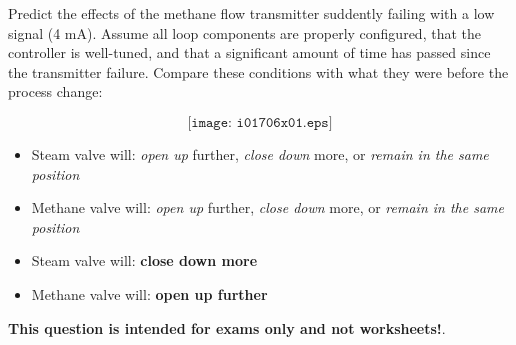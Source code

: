 

Predict the effects of the methane flow transmitter suddently failing with a low signal (4 mA).  Assume all loop components are properly configured, that the controller is well-tuned, and that a significant amount of time has passed since the transmitter failure.  Compare these conditions with what they were before the process change:

$$\texttt{[image: i01706x01.eps]}$$

\begin{itemize}
\item{} Steam valve will: {\it open up} further, {\it close down} more, or {\it remain in the same position} 
\vskip 10pt
\item{} Methane valve will: {\it open up} further, {\it close down} more, or {\it remain in the same position} 
\end{itemize}







\begin{itemize}
\item{} Steam valve will: {\bf close down more} 
\vskip 5pt
\item{} Methane valve will: {\bf open up further}
\end{itemize}







{\bf This question is intended for exams only and not worksheets!}.




